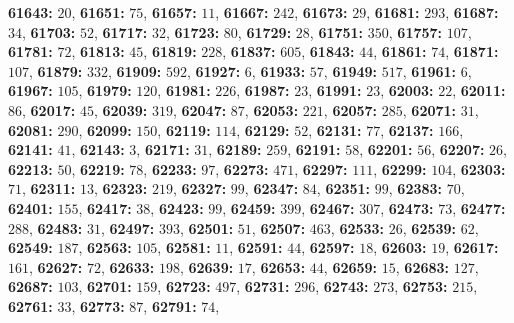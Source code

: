 \textsf{\bfseries 61643:} $20$, \textsf{\bfseries 61651:} $75$, \textsf{\bfseries 61657:} $11$, \textsf{\bfseries 61667:} $242$, \textsf{\bfseries 61673:} $29$, \textsf{\bfseries 61681:} $293$, \textsf{\bfseries 61687:} $34$, \textsf{\bfseries 61703:} $52$, \textsf{\bfseries 61717:} $32$, \textsf{\bfseries 61723:} $80$, \textsf{\bfseries 61729:} $28$, \textsf{\bfseries 61751:} $350$, \textsf{\bfseries 61757:} $107$, \textsf{\bfseries 61781:} $72$, \textsf{\bfseries 61813:} $45$, \textsf{\bfseries 61819:} $228$, \textsf{\bfseries 61837:} $605$, \textsf{\bfseries 61843:} $44$, \textsf{\bfseries 61861:} $74$, \textsf{\bfseries 61871:} $107$, \textsf{\bfseries 61879:} $332$, \textsf{\bfseries 61909:} $592$, \textsf{\bfseries 61927:} $6$, \textsf{\bfseries 61933:} $57$, \textsf{\bfseries 61949:} $517$, \textsf{\bfseries 61961:} $6$, \textsf{\bfseries 61967:} $105$, \textsf{\bfseries 61979:} $120$, \textsf{\bfseries 61981:} $226$, \textsf{\bfseries 61987:} $23$, \textsf{\bfseries 61991:} $23$, \textsf{\bfseries 62003:} $22$, \textsf{\bfseries 62011:} $86$, \textsf{\bfseries 62017:} $45$, \textsf{\bfseries 62039:} $319$, \textsf{\bfseries 62047:} $87$, \textsf{\bfseries 62053:} $221$, \textsf{\bfseries 62057:} $285$, \textsf{\bfseries 62071:} $31$, \textsf{\bfseries 62081:} $290$, \textsf{\bfseries 62099:} $150$, \textsf{\bfseries 62119:} $114$, \textsf{\bfseries 62129:} $52$, \textsf{\bfseries 62131:} $77$, \textsf{\bfseries 62137:} $166$, \textsf{\bfseries 62141:} $41$, \textsf{\bfseries 62143:} $3$, \textsf{\bfseries 62171:} $31$, \textsf{\bfseries 62189:} $259$, \textsf{\bfseries 62191:} $58$, \textsf{\bfseries 62201:} $56$, \textsf{\bfseries 62207:} $26$, \textsf{\bfseries 62213:} $50$, \textsf{\bfseries 62219:} $78$, \textsf{\bfseries 62233:} $97$, \textsf{\bfseries 62273:} $471$, \textsf{\bfseries 62297:} $111$, \textsf{\bfseries 62299:} $104$, \textsf{\bfseries 62303:} $71$, \textsf{\bfseries 62311:} $13$, \textsf{\bfseries 62323:} $219$, \textsf{\bfseries 62327:} $99$, \textsf{\bfseries 62347:} $84$, \textsf{\bfseries 62351:} $99$, \textsf{\bfseries 62383:} $70$, \textsf{\bfseries 62401:} $155$, \textsf{\bfseries 62417:} $38$, \textsf{\bfseries 62423:} $99$, \textsf{\bfseries 62459:} $399$, \textsf{\bfseries 62467:} $307$, \textsf{\bfseries 62473:} $73$, \textsf{\bfseries 62477:} $288$, \textsf{\bfseries 62483:} $31$, \textsf{\bfseries 62497:} $393$, \textsf{\bfseries 62501:} $51$, \textsf{\bfseries 62507:} $463$, \textsf{\bfseries 62533:} $26$, \textsf{\bfseries 62539:} $62$, \textsf{\bfseries 62549:} $187$, \textsf{\bfseries 62563:} $105$, \textsf{\bfseries 62581:} $11$, \textsf{\bfseries 62591:} $44$, \textsf{\bfseries 62597:} $18$, \textsf{\bfseries 62603:} $19$, \textsf{\bfseries 62617:} $161$, \textsf{\bfseries 62627:} $72$, \textsf{\bfseries 62633:} $198$, \textsf{\bfseries 62639:} $17$, \textsf{\bfseries 62653:} $44$, \textsf{\bfseries 62659:} $15$, \textsf{\bfseries 62683:} $127$, \textsf{\bfseries 62687:} $103$, \textsf{\bfseries 62701:} $159$, \textsf{\bfseries 62723:} $497$, \textsf{\bfseries 62731:} $296$, \textsf{\bfseries 62743:} $273$, \textsf{\bfseries 62753:} $215$, \textsf{\bfseries 62761:} $33$, \textsf{\bfseries 62773:} $87$, \textsf{\bfseries 62791:} $74$, 
